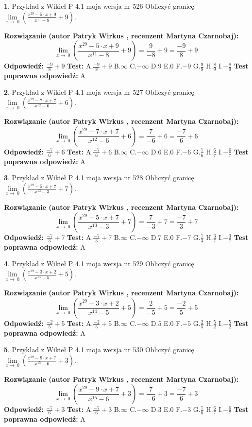 \documentclass[12pt, a4paper]{article}
\theoremstyle{definition} %
\newtheorem{zad}{}
\newcommand{\zadStart}[1]{\begin{zad}#1\newline}
\newcommand{\zadStop}{\end{zad}}
\newcommand{\rozwStart}[2]{\noindent \textbf{Rozwiązanie (autor #1 , recenzent #2): }\newline}
\newcommand{\rozwStop}{\newline}
\newcommand{\odpStart}{\noindent \textbf{Odpowiedź:}\newline}
\newcommand{\odpStop}{\newline}
\newcommand{\testStart}{\noindent \textbf{Test:}\newline}
\newcommand{\testStop}{\newline}
\newcommand{\kluczStart}{\noindent \textbf{Test poprawna odpowiedź:}\newline}
\newcommand{\kluczStop}{\newline}
\begin{document}
\zadStart{Przykład z Wikieł P 4.1 moja wersja nr 526}
Obliczyć granicę $\lim\limits_{x\to\ 0}(\frac{x^{29}-5 \cdot x +9}{x^{11}-8}+9)$.
\zadStop
\rozwStart{Patryk Wirkus}{Martyna Czarnobaj}
$$\lim\limits_{x\to\ 0}(\frac{x^{29}-5 \cdot x +9}{x^{11}-8}+9)=\frac{9}{-8}+9=\frac{-9}{8}+9$$
\rozwStop
\odpStart
$\frac{-9}{8}+9$
\odpStop
\testStart
A.$\frac{-9}{8}+9$
B.$\infty$
C.$-\infty$
D.$9$
E.$0$
F.$-9$
G.$\frac{9}{8}$
H.$\frac{8}{9}$
I.$-\frac{8}{9}$
\testStop
\kluczStart
A
\kluczStop



\zadStart{Przykład z Wikieł P 4.1 moja wersja nr 527}
Obliczyć granicę $\lim\limits_{x\to\ 0}(\frac{x^{29}-7 \cdot x +7}{x^{12}-6}+6)$.
\zadStop
\rozwStart{Patryk Wirkus}{Martyna Czarnobaj}
$$\lim\limits_{x\to\ 0}(\frac{x^{29}-7 \cdot x +7}{x^{12}-6}+6)=\frac{7}{-6}+6=\frac{-7}{6}+6$$
\rozwStop
\odpStart
$\frac{-7}{6}+6$
\odpStop
\testStart
A.$\frac{-7}{6}+6$
B.$\infty$
C.$-\infty$
D.$6$
E.$0$
F.$-6$
G.$\frac{7}{6}$
H.$\frac{6}{7}$
I.$-\frac{6}{7}$
\testStop
\kluczStart
A
\kluczStop



\zadStart{Przykład z Wikieł P 4.1 moja wersja nr 528}
Obliczyć granicę $\lim\limits_{x\to\ 0}(\frac{x^{29}-5 \cdot x +7}{x^{13}-3}+7)$.
\zadStop
\rozwStart{Patryk Wirkus}{Martyna Czarnobaj}
$$\lim\limits_{x\to\ 0}(\frac{x^{29}-5 \cdot x +7}{x^{13}-3}+7)=\frac{7}{-3}+7=\frac{-7}{3}+7$$
\rozwStop
\odpStart
$\frac{-7}{3}+7$
\odpStop
\testStart
A.$\frac{-7}{3}+7$
B.$\infty$
C.$-\infty$
D.$7$
E.$0$
F.$-7$
G.$\frac{7}{3}$
H.$\frac{3}{7}$
I.$-\frac{3}{7}$
\testStop
\kluczStart
A
\kluczStop



\zadStart{Przykład z Wikieł P 4.1 moja wersja nr 529}
Obliczyć granicę $\lim\limits_{x\to\ 0}(\frac{x^{29}-3 \cdot x +2}{x^{14}-5}+5)$.
\zadStop
\rozwStart{Patryk Wirkus}{Martyna Czarnobaj}
$$\lim\limits_{x\to\ 0}(\frac{x^{29}-3 \cdot x +2}{x^{14}-5}+5)=\frac{2}{-5}+5=\frac{-2}{5}+5$$
\rozwStop
\odpStart
$\frac{-2}{5}+5$
\odpStop
\testStart
A.$\frac{-2}{5}+5$
B.$\infty$
C.$-\infty$
D.$5$
E.$0$
F.$-5$
G.$\frac{2}{5}$
H.$\frac{5}{2}$
I.$-\frac{5}{2}$
\testStop
\kluczStart
A
\kluczStop



\zadStart{Przykład z Wikieł P 4.1 moja wersja nr 530}
Obliczyć granicę $\lim\limits_{x\to\ 0}(\frac{x^{29}-9 \cdot x +7}{x^{15}-6}+3)$.
\zadStop
\rozwStart{Patryk Wirkus}{Martyna Czarnobaj}
$$\lim\limits_{x\to\ 0}(\frac{x^{29}-9 \cdot x +7}{x^{15}-6}+3)=\frac{7}{-6}+3=\frac{-7}{6}+3$$
\rozwStop
\odpStart
$\frac{-7}{6}+3$
\odpStop
\testStart
A.$\frac{-7}{6}+3$
B.$\infty$
C.$-\infty$
D.$3$
E.$0$
F.$-3$
G.$\frac{7}{6}$
H.$\frac{6}{7}$
I.$-\frac{6}{7}$
\testStop
\kluczStart
A
\kluczStop
\end{document}
